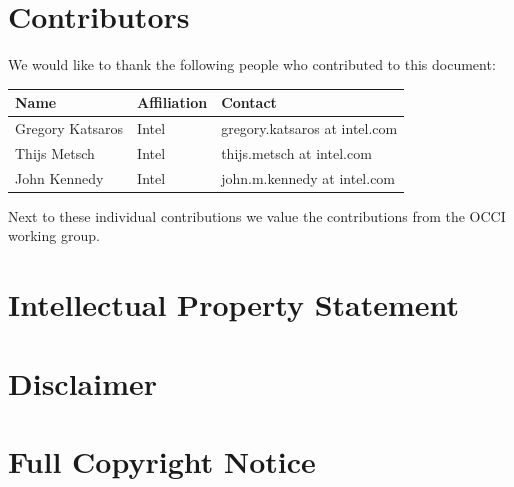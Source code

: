 \documentclass[10pt,a4paper]{article}
\begin{document}
\section{Contributors}
%

We would like to thank the following people who contributed to this document:

\begin{tabular}{l|p{2in}|p{2in}}
Name & Affiliation & Contact \\
\hline
Gregory Katsaros & Intel & gregory.katsaros at intel.com \\
Thijs Metsch & Intel & thijs.metsch at intel.com \\
John Kennedy & Intel & john.m.kennedy at intel.com \\
\end{tabular}

Next to these individual contributions we value the contributions from the OCCI working group.

\section{Intellectual Property Statement}


\section{Disclaimer}


\section{Full Copyright Notice}





\appendix
\end{document}
